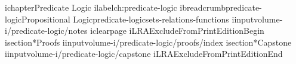 ichapter{Predicate Logic}
ilabel{ch:predicate-logic}
ibreadcrumb{predicate-logic}{Propositional Logic}{predicate-logic}{sets-relations-functions}
iinput{volume-i/predicate-logic/notes}
iclearpage
iLRAExcludeFromPrintEditionBegin
isection*{Proofs}
iinput{volume-i/predicate-logic/proofs/index}
isection*{Capstone}
iinput{volume-i/predicate-logic/capstone}
iLRAExcludeFromPrintEditionEnd
